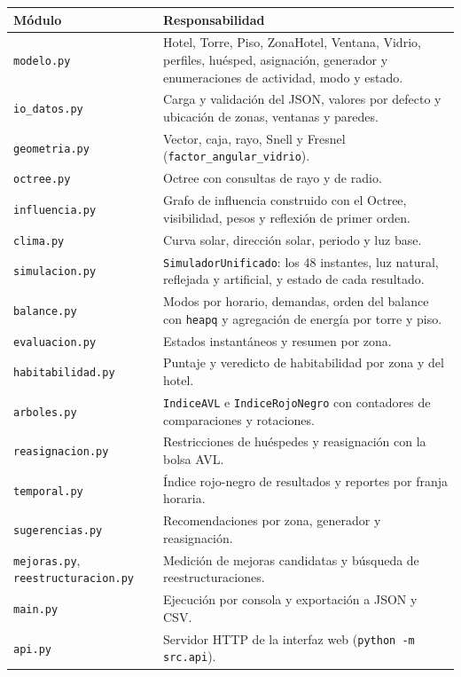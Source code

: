 \documentclass[12pt,a4paper]{article}
\newcommand{\clase}[1]{\texttt{#1}}
\newcommand{\codigo}[1]{\texttt{#1}}
\begin{document}
\begin{center}\small
\begin{tabular}{p{}p{}}
\toprule
\textbf{Módulo} & \textbf{Responsabilidad}\\
\midrule
\codigo{modelo.py} & Hotel, Torre, Piso, ZonaHotel, Ventana, Vidrio, perfiles, huésped, asignación, generador y enumeraciones de actividad, modo y estado.\\
\codigo{io\_datos.py} & Carga y validación del JSON, valores por defecto y ubicación de zonas, ventanas y paredes.\\
\codigo{geometria.py} & Vector, caja, rayo, Snell y Fresnel (\codigo{factor\_angular\_vidrio}).\\
\codigo{octree.py} & Octree con consultas de rayo y de radio.\\
\codigo{influencia.py} & Grafo de influencia construido con el Octree, visibilidad, pesos y reflexión de primer orden.\\
\codigo{clima.py} & Curva solar, dirección solar, periodo y luz base.\\
\codigo{simulacion.py} & \clase{SimuladorUnificado}: los 48 instantes, luz natural, reflejada y artificial, y estado de cada resultado.\\
\codigo{balance.py} & Modos por horario, demandas, orden del balance con \codigo{heapq} y agregación de energía por torre y piso.\\
\codigo{evaluacion.py} & Estados instantáneos y resumen por zona.\\
\codigo{habitabilidad.py} & Puntaje y veredicto de habitabilidad por zona y del hotel.\\
\codigo{arboles.py} & \clase{IndiceAVL} e \clase{IndiceRojoNegro} con contadores de comparaciones y rotaciones.\\
\codigo{reasignacion.py} & Restricciones de huéspedes y reasignación con la bolsa AVL.\\
\codigo{temporal.py} & Índice rojo-negro de resultados y reportes por franja horaria.\\
\codigo{sugerencias.py} & Recomendaciones por zona, generador y reasignación.\\
\codigo{mejoras.py}, \codigo{reestructuracion.py} & Medición de mejoras candidatas y búsqueda de reestructuraciones.\\
\codigo{main.py} & Ejecución por consola y exportación a JSON y CSV.\\
\codigo{api.py} & Servidor HTTP de la interfaz web (\codigo{python -m src.api}).\\
\bottomrule
\end{tabular}
\end{center}
\end{document}
